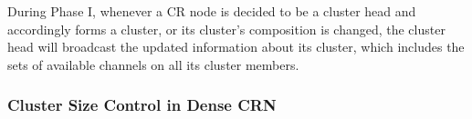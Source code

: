 \documentclass[times]{ettauth}
\theoremstyle{mytheoremstyle}
\theoremstyle{mytheoremstyle}
\theoremstyle{mytheoremstyle}
\begin{document}
During Phase I, whenever a CR node is decided to be a cluster head and accordingly forms a cluster, or its cluster's composition is changed, the cluster head will broadcast the updated information about its cluster, which includes the sets of available channels on all its cluster members.


\subsubsection{Cluster Size Control in Dense CRN}
\label{ross_p2_cluster_pruning}

%
\end{document}
